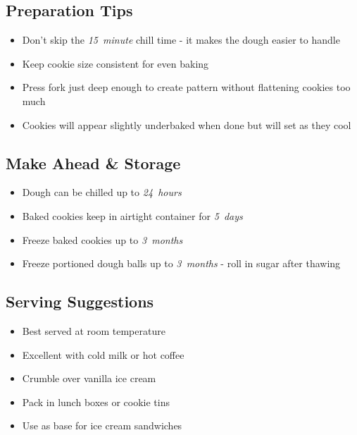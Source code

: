\documentclass[11pt,letterpaper]{article}
\begin{document}
{\begin{multicols}{2}
\subsection*{Preparation Tips}
\begin{itemize}
    \item Don't skip the \textit{15~minute} chill time - it makes the dough easier to handle
    \item Keep cookie size consistent for even baking
    \item Press fork just deep enough to create pattern without flattening cookies too much
    \item Cookies will appear slightly underbaked when done but will set as they cool
\end{itemize}

\subsection*{Make Ahead \& Storage}
\begin{itemize}
    \item Dough can be chilled up to \textit{24~hours}
    \item Baked cookies keep in airtight container for \textit{5~days}
    \item Freeze baked cookies up to \textit{3~months}
    \item Freeze portioned dough balls up to \textit{3~months} - roll in sugar after thawing
\end{itemize}

\subsection*{Serving Suggestions}
\begin{itemize}
    \item Best served at room temperature
    \item Excellent with cold milk or hot coffee
    \item Crumble over vanilla ice cream
    \item Pack in lunch boxes or cookie tins
    \item Use as base for ice cream sandwiches
\end{itemize}

\end{multicols}
}
\end{document}
